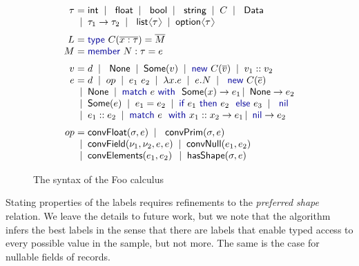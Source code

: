 \documentclass[10pt,preprint,clearpagebib]{sigplanconf}
\newcommand{\langl}{\begin{picture}(4.5,7)
\put(1.1,2.5){\rotatebox{60}{\line(1,0){5.5}}}
\put(1.1,2.5){\rotatebox{300}{\line(1,0){5.5}}}
\end{picture}}
\newcommand{\rangl}{\begin{picture}(4.5,7)
\put(.9,2.5){\rotatebox{120}{\line(1,0){5.5}}}
\put(.9,2.5){\rotatebox{240}{\line(1,0){5.5}}}
\end{picture}}
\newcommand{\kvd}[1]{\textnormal{\textcolor{kvdclr}{\sffamily #1}}}
\newcommand{\ident}[1]{\textnormal{\sffamily #1}}
\newcommand{\lsep}[0]{\;\; | \;\;}
\newcommand{\narrow}[1]{\hspace{-0.7em} #1 \hspace{-0.7em}}
\begin{document}
\begin{figure}[!h]
\noindent
\begin{equation*}
\begin{array}{rcl}
 \tau &\narrow{=}& \ident{int} \lsep \ident{float} \lsep \ident{bool} \lsep \ident{string} \lsep C \lsep \ident{Data} \\[0.0em]
      &\narrow{|}& \tau_1 \rightarrow \tau_2 \lsep \ident{list}\langl\tau\rangl \lsep \ident{option}\langl\tau\rangl 
\\[0.6em]
 L &\narrow{=}& \kvd{type}~C(\overline{x:\tau}) = \overline{M} \\[0.0em]
 M &\narrow{=}& \kvd{member}~N:\tau= e
\\[0.6em]
 v &\narrow{=}& d \lsep \ident{None} \lsep \ident{Some}(v) \lsep \kvd{new}~C(\overline{v}) \lsep v_1::v_2 \\[0.0em]
 e &\narrow{=}& d \lsep op \lsep e_1~e_2 \lsep \lambda x.e \lsep e.N \lsep \kvd{new}~C(\overline{e}) \\
   &\narrow{|}& \ident{None} \lsep\kvd{match}~e~\kvd{with}~\ident{Some}(x) \rightarrow e_1 \,|\, \ident{None} \rightarrow e_2 \\
   &\narrow{|}& \ident{Some}(e) \lsep e_1 = e_2 \lsep {\kvd{if}~e_1~\kvd{then}~e_2~\kvd{else}~e_3} \lsep \kvd{nil} \\
   &\narrow{|}& e_1 :: e_2 \lsep \kvd{match}~e~\kvd{with}~x_1::x_2 \rightarrow e_1 \,|\, \kvd{nil} \rightarrow e_2 
\\[0.6em]
op &\narrow{=}& \ident{convFloat}(\sigma, e) \lsep \ident{convPrim}(\sigma, e) \\
   &\narrow{|}& \ident{convField}(\nu_1, \nu_2, e, e) \lsep \ident{convNull}(e_1, e_2) \\
   &\narrow{|}& \ident{convElements}(e_1, e_2) \,\lsep \ident{hasShape}(\sigma, e) 
\end{array}
\end{equation*}

\caption{The syntax of the Foo calculus}
\label{fig:foo-syntax}
\vspace{-0.5em}
\end{figure}


Stating properties of the labels requires refinements to the \emph{preferred shape} relation.
We leave the details to future work, but we
note that the algorithm infers the best labels in the sense that there are labels that enable 
typed access to every possible value in the sample, but not more. The same is the case for nullable
fields of records.
\end{document}
